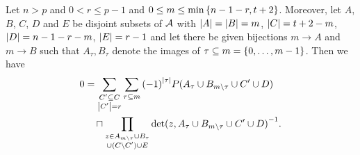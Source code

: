 \begin{lemma}
    Let $n>p$ and $0< r\leq p-1$ and $0\leq m\leq \min\set{n-1-r,t+2}$. Moreover, let $A$, $B$, $C$, $D$ and $E$ be disjoint subsets of $\mathcal{A}$ with $\left\vert{A}\right\vert=\left\vert{B}\right\vert=m$, $\left\vert{C}\right\vert=t+2-m$, $\left\vert{D}\right\vert=n-1-r-m$, $\left\vert{E}\right\vert=r-1$ and let there be given bijections $m\to A$ and $m\to B$ such that $A_\tau, B_\tau$ denote the images of $\tau\setleq m=\set{\range 0 {m-1}}$. Then we have
    \begin{align*}
        0 & = \sum_{\substack{C'\setleq C                                                                       \\
                \card{C'}=r}}
        {\sum_{\tau\setleq m}{{(-1)}^{\card{\tau}}P(A_{\tau}\setjoin B_{m\setminus\tau}\setjoin C'\setjoin D)}} \\
          & \quad\setprod\prod_{\substack{z\in A_{m\setminus\tau}\setjoin B_{\tau}                                  \\
                  \setjoin(C\setminus C')\setjoin E}}
          {{\det(z,A_{\tau}\setjoin B_{m\setminus\tau}\setjoin C'\setjoin D)}^{-1}}.
\end{align*}
\end{lemma}
